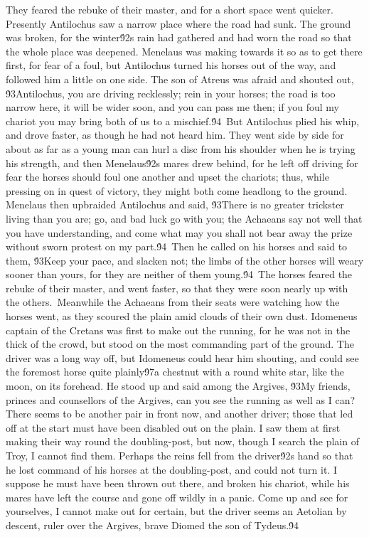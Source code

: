 {They feared the rebuke of their master, and for a short space went quicker. Presently Antilochus saw a narrow place where the road had sunk. The ground was broken, for the winter\'92s rain had gathered and had worn the road so that the whole place was deepened. Menelaus was making towards it so as to get there first, for fear of a foul, but Antilochus turned his horses out of the way, and followed him a little on one side. The son of Atreus was afraid and shouted out, \'93Antilochus, you are driving recklessly; rein in your horses; the road is too narrow here, it will be wider soon, and you can pass me then; if you foul my chariot you may bring both of us to a mischief.\'94\
But Antilochus plied his whip, and drove faster, as though he had not heard him. They went side by side for about as far as a young man can hurl a disc from his shoulder when he is trying his strength, and then Menelaus\'92s mares drew behind, for he left off driving for fear the horses should foul one another and upset the chariots; thus, while pressing on in quest of victory, they might both come headlong to the ground. Menelaus then upbraided Antilochus and said, \'93There is no greater trickster living than you are; go, and bad luck go with you; the Achaeans say not well that you have understanding, and come what may you shall not bear away the prize without sworn protest on my part.\'94\
Then he called on his horses and said to them, \'93Keep your pace, and slacken not; the limbs of the other horses will weary sooner than yours, for they are neither of them young.\'94\
The horses feared the rebuke of their master, and went faster, so that they were soon nearly up with the others.\
Meanwhile the Achaeans from their seats were watching how the horses went, as they scoured the plain amid clouds of their own dust. Idomeneus captain of the Cretans was first to make out the running, for he was not in the thick of the crowd, but stood on the most commanding part of the ground. The driver was a long way off, but Idomeneus could hear him shouting, and could see the foremost horse quite plainly\'97a chestnut with a round white star, like the moon, on its forehead. He stood up and said among the Argives, \'93My friends, princes and counsellors of the Argives, can you see the running as well as I can? There seems to be another pair in front now, and another driver; those that led off at the start must have been disabled out on the plain. I saw them at first making their way round the doubling-post, but now, though I search the plain of Troy, I cannot find them. Perhaps the reins fell from the driver\'92s hand so that he lost command of his horses at the doubling-post, and could not turn it. I suppose he must have been thrown out there, and broken his chariot, while his mares have left the course and gone off wildly in a panic. Come up and see for yourselves, I cannot make out for certain, but the driver seems an Aetolian by descent, ruler over the Argives, brave Diomed the son of Tydeus.\'94\
}
